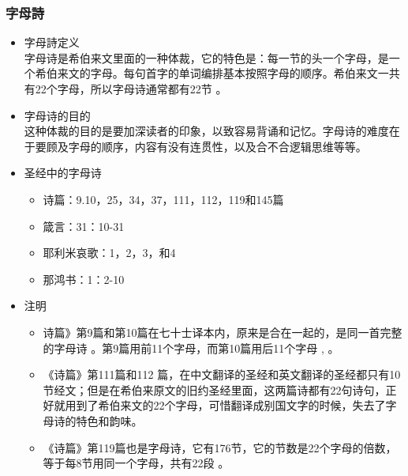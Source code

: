 \subsubsection{字母詩}
\begin{itemize}
\itemsep-.45em 
\item 字母詩定义\\
字母诗是希伯来文里面的一种体裁，它的特色是：每一节的头一个字母，是一个希伯来文的字母。每句首字的单词编排基本按照字母的顺序。希伯来文一共有22个字母，所以字母诗通常都有22节 。
\item 字母诗的目的\\
这种体裁的目的是要加深读者的印象，以致容易背诵和记忆。字母诗的难度在于要顾及字母的顺序，内容有没有连贯性，以及合不合逻辑思维等等。
\item 圣经中的字母诗
\begin{itemize}
\item 	诗篇：9.10，25，34，37，111，112，119和145篇
\item 	箴言：31：10-31
\item 	耶利米哀歌：1，2，3，和4
\item 	那鸿书：1：2-10
\end{itemize}

\item 注明
\begin{itemize}
\item 	诗篇》第9篇和第10篇在七十士译本内，原来是合在一起的，是同一首完整的字母诗 。第9篇用前11个字母，而第10篇用后11个字母 , 。
\item 	《诗篇》第111篇和112 篇，在中文翻译的圣经和英文翻译的圣经都只有10节经文；但是在希伯来原文的旧约圣经里面，这两篇诗都有22句诗句，正好就用到了希伯来文的22个字母，可惜翻译成别国文字的时候，失去了字母诗的特色和韵味。
\item 	《诗篇》第119篇也是字母诗，它有176节，它的节数是22个字母的倍数，等于每8节用同一个字母，共有22段 。
\end{itemize}


\end{itemize}

